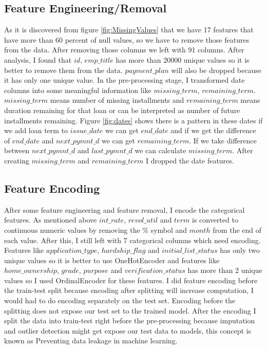 \documentclass[12pt]{article}
\begin{document}
\subsection{Feature Engineering/Removal}
As it is discovered from figure \ref{fig:MissingValues} that we have 17 features that have more than 60 percent of null values, so we have to remove those features from the data. After removing those columns we left with 91 columns. After analysis, I found that $id$, $emp\_title$ has more than 20000 unique values so it is better to remove them from the data. $payment\_plan$ will also be dropped because it has only one unique value. In the pre-processing stage, I transformed date columns into some meaningful information like $missing\_term$, $remaining\_term$. $missing\_term$ means number of missing installments and $remaining\_term$ means duration remaining for that loan or can be interpreted as number of future installments remaining. Figure \ref{fig:dates} shows there is a pattern in these dates if we add loan term to $issue\_date$ we can get $end\_date$ and if we get the difference of $end\_date$ and $next\_pymnt\_d$ we can get $remaining\_term$. If we take difference between $next\_pymnt\_d$ and $last\_pymnt\_d$ we can calculate $missing\_term$. After creating $missing\_term$ and $remaining\_term$ I dropped the date features.

\subsection{Feature Encoding}
After some feature engineering and feature removal, I encode the categorical features. As mentioned above $int\_rate$, $revol\_util$ and $term$ is converted to continuous numeric values by removing the $\%$ symbol and $month$ from the end of each value. After this, I still left with 7 categorical columns which need encoding. Features like $application\_type$, $hardship\_flag$ and $initial\_list\_status$ has only two unique values so it is better to use OneHotEncoder and features like $home\_ownership$, $grade$, $purpose$ and $verification\_status$ has more than 2
unique values so I used OrdinalEncoder for these features. I did feature encoding before the train-test split because encoding after splitting will increase computation, I would had to do encoding separately on the test set. Encoding before the splitting does not expose our test set to the trained model. After the encoding I split the data into train-test right before the pre-processing because imputation and outlier detection might get expose our test data to models, this concept is known as Preventing data leakage in machine learning.
 
\end{document}
